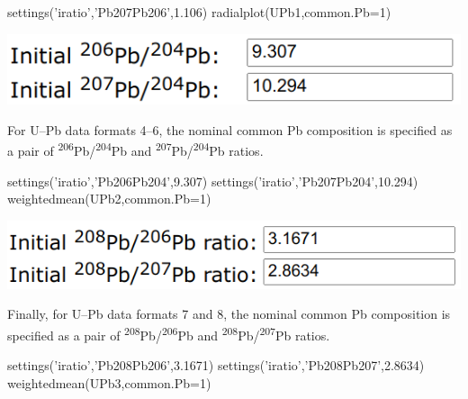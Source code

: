 \begin{refsection}
\begin{enumerate}
\begin{enumerate}
\begin{script}
settings('iratio','Pb207Pb206',1.106)
radialplot(UPb1,common.Pb=1)
\end{script}

  \noindent\begin{minipage}[t]{.4\linewidth}
  \strut\vspace*{-\baselineskip}\newline
  \includegraphics[width=\linewidth]{../figures/initialPb764.png}
  \end{minipage}
  \begin{minipage}[t]{.6\linewidth}
    For U--Pb data formats 4--6, the nominal common Pb composition is specified
    as a pair of \textsuperscript{206}Pb/\textsuperscript{204}Pb and 
    \textsuperscript{207}Pb/\textsuperscript{204}Pb ratios.
  \end{minipage}

\begin{script}
settings('iratio','Pb206Pb204',9.307)
settings('iratio','Pb207Pb204',10.294)
weightedmean(UPb2,common.Pb=1)
\end{script}

  \noindent\begin{minipage}[t]{.4\linewidth}
  \strut\vspace*{-\baselineskip}\newline
  \includegraphics[width=\linewidth]{../figures/initialPb876.png}
  \end{minipage}
  \begin{minipage}[t]{.6\linewidth}
    Finally, for U--Pb data formats 7 and 8, the nominal common Pb
    composition is specified as a pair of
    \textsuperscript{208}Pb/\textsuperscript{206}Pb and
    \textsuperscript{208}Pb/\textsuperscript{207}Pb ratios.
  \end{minipage}

\begin{script}
settings('iratio','Pb208Pb206',3.1671)
settings('iratio','Pb208Pb207',2.8634)
weightedmean(UPb3,common.Pb=1)
\end{script}


\end{enumerate}
\end{enumerate}
\end{refsection}

